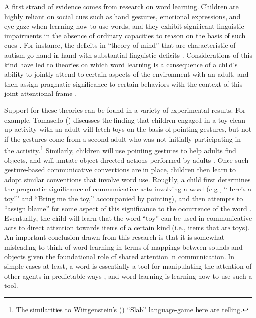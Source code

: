 A first strand of evidence comes from research on word learning. Children are highly reliant on social cues such as hand gestures, emotional expressions, and eye gaze when learning how to use words, and they exhibit significant linguistic impairments in the absence of ordinary capacities to reason on the basis of such cues \citep[][p. 1099-1100]{Bloom:2001}. For instance, the deficits in ``theory of mind'' that are characteristic of autism go hand-in-hand with substantial linguistic deficits \citep{Bloom:2001,Miller:2006,Harley:2014}. Considerations of this kind have led to theories on which word learning is a consequence of a child's ability to jointly attend to certain aspects of the environment with an adult, and then assign pragmatic significance to certain behaviors with the context of this joint attentional frame \citep{Tomasello:2005,Miller:2006}. 

Support for these theories can be found in a variety of experimental results. For example, Tomasello (\citeyear{Tomasello:2005}) discusses the finding that children engaged in a toy clean-up activity with an adult will fetch toys on the basis of pointing gestures, but not if the gestures come from a second adult who was not initially participating in the activity.\footnote{The similarities to Wittgenstein's (\citeyear{Wittgenstein:1953}) ``Slab'' language-game here are telling.} Similarly, children will use pointing gestures to help adults find objects, and will imitate object-directed actions performed by adults \citep{Tomasello:2001}. Once such gesture-based communicative conventions are in place, children then learn to adopt similar conventions that involve word use. Roughly, a child first determines the pragmatic significance of communicative acts involving a word (e.g., ``Here's a toy!'' and ``Bring me the toy,'' accompanied by pointing), and then attempts to ``assign blame'' for some aspect of this significance to the occurrence of the word \citep[][p. 73]{Tomasello:2005}. Eventually, the child will learn that the word ``toy'' can be used in communicative acts to direct attention towards items of a certain kind (i.e., items that are toys). An important conclusion drawn from this research is that it is somewhat misleading to think of word learning in terms of mappings between sounds and objects given the foundational role of shared attention in communication. In simple cases at least, a word is essentially a tool for manipulating the attention of other agents in predictable ways \citep{Tomasello:2001}, and word learning is learning how to use such a tool. 

